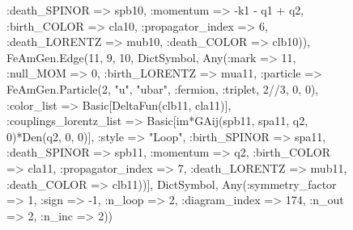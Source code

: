 \documentclass{revtex4}
\begin{document}
\begin{figure}[!htb]
\begin{center}
{:death_SPINOR => spb10, :momentum => -k1 - q1 + q2, :birth_COLOR => cla10, :propagator_index => 6, :death_LORENTZ => mub10, :death_COLOR => clb10)), FeAmGen.Edge(11, 9, 10, Dict{Symbol, Any}(:mark => 11, :null_MOM => 0, :birth_LORENTZ => mua11, :particle => FeAmGen.Particle(2, "u", "ubar", :fermion, :triplet, 2//3, 0, 0), :color_list => Basic[DeltaFun(clb11, cla11)], :couplings_lorentz_list => Basic[im*GAij(spb11, spa11, q2, 0)*Den(q2, 0, 0)], :style => "Loop", :birth_SPINOR => spa11, :death_SPINOR => spb11, :momentum => q2, :birth_COLOR => cla11, :propagator_index => 7, :death_LORENTZ => mub11, :death_COLOR => clb11))], Dict{Symbol, Any}(:symmetry_factor => 1, :sign => -1, :n_loop => 2, :diagram_index => 174, :n_out => 2, :n_inc => 2)) 
}
\end{center}
\end{figure}
\end{document}

